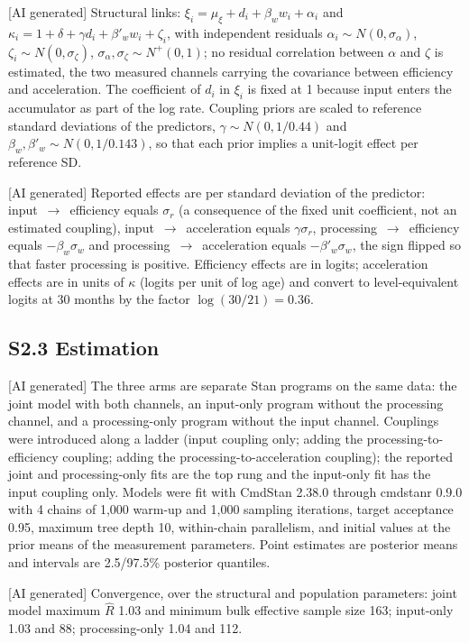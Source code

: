 [AI generated] Structural links: $\xi_i = \mu_\xi + d_i + \beta_w w_i +
\alpha_i$ and $\kappa_i = 1 + \delta + \gamma d_i + \beta'_w w_i + \zeta_i$, with
independent residuals $\alpha_i \sim N(0, \sigma_\alpha)$, $\zeta_i \sim N(0,
\sigma_\zeta)$, $\sigma_\alpha, \sigma_\zeta \sim N^+(0, 1)$; no residual
correlation between $\alpha$ and $\zeta$ is estimated, the two measured channels
carrying the covariance between efficiency and acceleration. The coefficient of
$d_i$ in $\xi_i$ is fixed at 1 because input enters the accumulator as part of the
log rate. Coupling priors are scaled to reference standard deviations of the
predictors, $\gamma \sim N(0, 1/0.44)$ and $\beta_w, \beta'_w \sim N(0,
1/0.143)$, so that each prior implies a unit-logit effect per reference SD.

[AI generated] Reported effects are per standard deviation of the predictor:
input~$\to$~efficiency equals $\sigma_r$ (a consequence of the fixed unit
coefficient, not an estimated coupling), input~$\to$~acceleration equals $\gamma
\sigma_r$, processing~$\to$~efficiency equals $-\beta_w \sigma_w$ and
processing~$\to$~acceleration equals $-\beta'_w \sigma_w$, the sign flipped so that
faster processing is positive. Efficiency effects are in logits; acceleration
effects are in units of $\kappa$ (logits per unit of log age) and convert to
level-equivalent logits at 30 months by the factor $\log(30/21) = 0.36$.

\subsection*{S2.3 Estimation}

[AI generated] The three arms are separate Stan programs on the same data: the
joint model with both channels, an input-only program without the processing
channel, and a processing-only program without the input channel. Couplings were
introduced along a ladder (input coupling only; adding the processing-to-efficiency
coupling; adding the processing-to-acceleration coupling); the reported joint and
processing-only fits are the top rung and the input-only fit has the input coupling
only. Models were fit with CmdStan 2.38.0 through cmdstanr 0.9.0 with 4 chains of
1,000 warm-up and 1,000 sampling iterations, target acceptance 0.95, maximum tree
depth 10, within-chain parallelism, and initial values at the prior means of the
measurement parameters. Point estimates are posterior means and intervals are
2.5/97.5\% posterior quantiles.

[AI generated] Convergence, over the structural and population parameters: joint
model maximum $\hat R$ 1.03 and minimum bulk effective sample size 163; input-only
1.03 and 88; processing-only 1.04 and 112.

